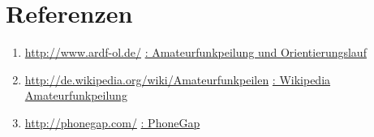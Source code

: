 
\newpage
\section{Referenzen} %
\label{sec:referenzen}

\begin{enumerate}
  \item \url{http://www.ardf-ol.de/} \href{http://www.ardf-ol.de/}{: Amateurfunkpeilung und Orientierungslauf}
  \item \url{http://de.wikipedia.org/wiki/Amateurfunkpeilen} \href{http://de.wikipedia.org/wiki/Amateurfunkpeilen}{: Wikipedia Amateurfunkpeilung}
  \item \url{http://phonegap.com/} \href{http://phonegap.com/}{: PhoneGap} 
\end{enumerate}

